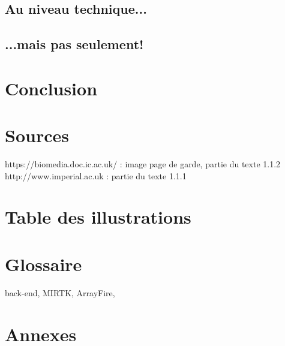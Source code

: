 \documentclass[10pt]{report}
\begin{document}
	\section{Au niveau technique...}
	\section{...mais pas seulement!}

\chapter*{Conclusion} %
\chapter*{Sources}
https://biomedia.doc.ic.ac.uk/  : image page de garde, partie du texte 1.1.2 \\
http://www.imperial.ac.uk : partie du texte 1.1.1
\chapter*{Table des illustrations}
\chapter*{Glossaire}
back-end, MIRTK, ArrayFire,
\chapter*{Annexes}
\end{document}
